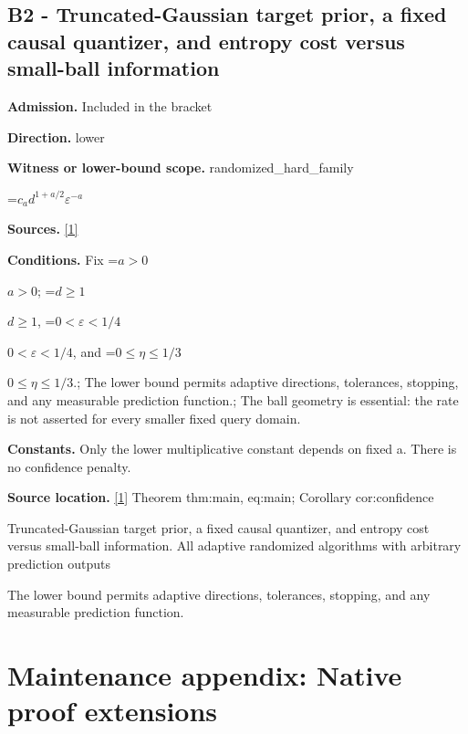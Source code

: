 \documentclass[10pt,a4paper]{article}
\newcommand{\AtlasMath}[1]{\par\begingroup\centering\setbox0=\hbox{$\displaystyle #1$}\ifdim\wd0>1.4\linewidth\typeout{ATLAS WIDE FORMULA: \the\wd0}\fi\ifdim\wd0>\linewidth\resizebox{\linewidth}{!}{\box0}\else\box0\fi\par\endgroup}
\newcommand{\AtlasInlineMath}[1]{\begingroup\setbox0=\hbox{$#1$}\ifdim\wd0>.4\linewidth\endgroup\AtlasMath{#1}\else\endgroup$#1$\fi}
\begin{document}
\subsection{B2 - Truncated-Gaussian target prior, a fixed causal quantizer, and entropy cost versus small-ball information}


\textbf{Admission.} Included in the bracket



\textbf{Direction.} lower



\textbf{Witness or lower-bound scope.} randomized\_hard\_family



\AtlasMath{c_a d^{1+a/2}\varepsilon^{-a}}


\textbf{Sources.} \href{https://github.com/WU-Wendao/Colombo/blob/main/colombo_sensorium/Complexity_altas/data/sources/colombo/H18/manuscript.pdf}{[1]}



\textbf{Conditions.} Fix \AtlasInlineMath{a>0}; \AtlasInlineMath{d\ge1}, \AtlasInlineMath{0<\varepsilon<1/4}, and \AtlasInlineMath{0\le\eta\le1/3}.; The lower bound permits adaptive directions, tolerances, stopping, and any measurable prediction function.; The ball geometry is essential: the rate is not asserted for every smaller fixed query domain.



\textbf{Constants.} Only the lower multiplicative constant depends on fixed a. There is no confidence penalty.



\textbf{Source location.} \href{https://github.com/WU-Wendao/Colombo/blob/main/colombo_sensorium/Complexity_altas/data/sources/colombo/H18/manuscript.pdf}{[1]} Theorem thm:main, eq:main; Corollary cor:confidence



Truncated-Gaussian target prior, a fixed causal quantizer, and entropy cost versus small-ball information. All adaptive randomized algorithms with arbitrary prediction outputs



The lower bound permits adaptive directions, tolerances, stopping, and any measurable prediction function.



\section{Maintenance appendix: Native proof extensions}
\end{document}
